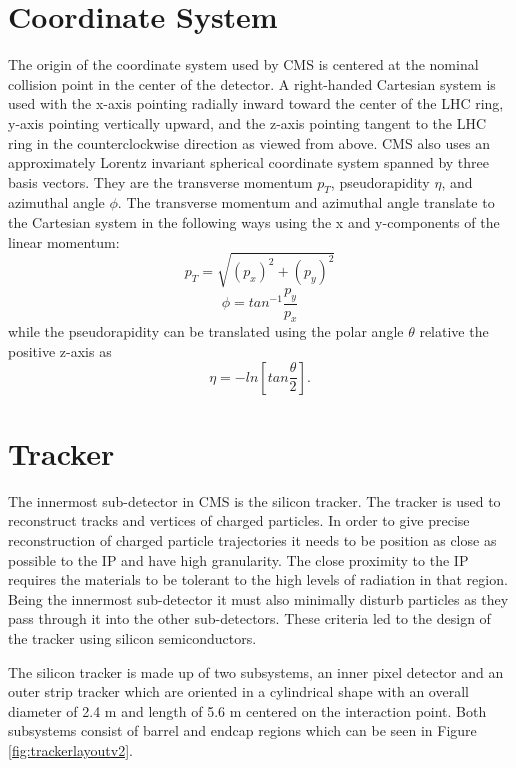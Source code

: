 \section{Coordinate System}
The origin of the coordinate system used by CMS is centered at the nominal collision point in the center of the detector.  A right-handed Cartesian system is used with the x-axis pointing radially inward toward the center of the LHC ring, y-axis pointing vertically upward, and the z-axis pointing tangent to the LHC ring in the counterclockwise direction as viewed from above.  CMS also uses an approximately Lorentz invariant spherical coordinate system spanned by three basis vectors.  They are the transverse momentum $p_{T}$, pseudorapidity $\eta$, and azimuthal angle $\phi$.  The transverse momentum and azimuthal angle translate to the Cartesian system in the following ways using the x and y-components of the linear momentum:
\begin{equation}
p_{T} = \sqrt{(p_{x})^{2} + (p_{y})^{2}}
\end{equation}
\begin{equation}
\phi = tan^{-1}\frac{p_{y}}{p_{x}}
\end{equation}
while the pseudorapidity can be translated using the polar angle $\theta$ relative the positive z-axis as
\begin{equation}
\eta = -ln[tan\frac{\theta}{2}].
\end{equation}


\section{Tracker}
The innermost sub-detector in CMS is the silicon tracker.  The tracker is used to reconstruct tracks and vertices of charged particles.  In order to give precise reconstruction of charged particle trajectories it needs to be position as close as possible to the IP and have high granularity.  The close proximity to the IP requires the materials to be tolerant to the high levels of radiation in that region.  Being the innermost sub-detector it must also minimally disturb particles as they pass through it into the other sub-detectors.  These criteria led to the design of the tracker using silicon semiconductors.

The silicon tracker is made up of two subsystems, an inner pixel detector and an outer strip tracker which are oriented in a cylindrical shape with an overall diameter of 2.4 m and length of 5.6 m centered on the interaction point.  Both subsystems consist of barrel and endcap regions which can be seen in Figure \ref{fig:trackerlayoutv2}.  

